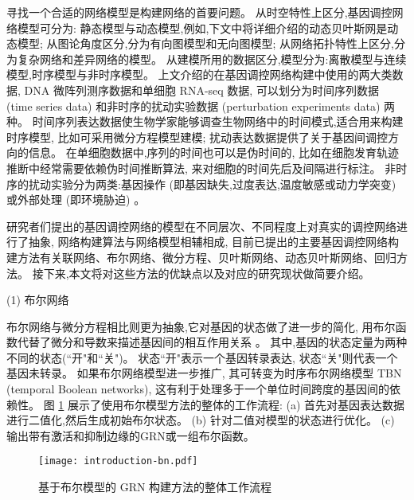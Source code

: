 寻找一个合适的网络模型是构建网络的首要问题。
从时空特性上区分,基因调控网络模型可分为:
静态模型与动态模型,例如,下文中将详细介绍的动态贝叶斯网是动态模型;
从图论角度区分,分为有向图模型和无向图模型;
从网络拓扑特性上区分,分为复杂网络和差异网络的模型。 
从建模所用的数据区分,模型分为:离散模型与连续模型,时序模型与非时序模型。
上文介绍的在基因调控网络构建中使用的两大类数据, DNA 微阵列测序数据和单细胞 RNA-seq 数据, 
可以划分为时间序列数据 (time series data) 和非时序的扰动实验数据 (perturbation experiments data) 两种。
时间序列表达数据使生物学家能够调查生物网络中的时间模式,适合用来构建时序模型, 比如可采用微分方程模型建模; 
扰动表达数据提供了关于基因间调控方向的信息。
在单细胞数据中,序列的时间也可以是伪时间的, 比如在细胞发育轨迹推断中经常需要依赖伪时间推断算法, 来对细胞的时间先后及间隔进行标注。
非时序的扰动实验分为两类:基因操作 (即基因缺失,过度表达,温度敏感或动力学突变)  或外部处理 (即环境胁迫) 。


研究者们提出的基因调控网络的模型在不同层次、不同程度上对真实的调控网络进行了抽象,
网络构建算法与网络模型相辅相成,
目前已提出的主要基因调控网络构建方法有关联网络、布尔网络、微分方程、贝叶斯网络、动态贝叶斯网络、回归方法。
接下来,本文将对这些方法的优缺点以及对应的研究现状做简要介绍。

(1) 布尔网络

布尔网络与微分方程相比则更为抽象,它对基因的状态做了进一步的简化,
用布尔函数代替了微分和导数来描述基因间的相互作用关系  。
其中,基因的状态定量为两种不同的状态(``开"和``关")。
状态``开"表示一个基因转录表达, 状态``关"则代表一个基因未转录。
如果布尔网络模型进一步推广, 其可转变为时序布尔网络模型 TBN (temporal Boolean networks), 这有利于处理多于一个单位时间跨度的基因间的依赖性。
图 \ref{fig:pre-bn} 展示了使用布尔模型方法的整体的工作流程: (a) 首先对基因表达数据进行二值化,然后生成初始布尔状态。
(b) 针对二值对模型的状态进行优化。
(c) 输出带有激活和抑制边缘的GRN或一组布尔函数。
\begin{figure}[!htbp]
    \centering
    \texttt{[image: introduction-bn.pdf]}
    \caption{
        基于布尔模型的 GRN 构建方法的整体工作流程
    }
    \label{fig:pre-bn}
\end{figure}

